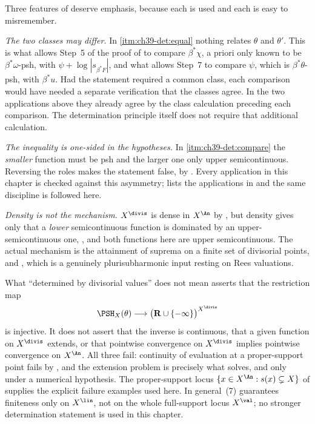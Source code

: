 Three features of  deserve emphasis,
because each is used and each is easy to misremember.

\emph{The two classes may differ.}  In \cref{itm:ch39-det:equal} nothing
relates $\theta$ and $\theta'$.  This is what allows Step~5 of the proof
of  to compare $\beta^*\chi$, a
priori only known to be $\beta^*\omega$-psh, with
$\psi+\log|s_{\beta^*F}|$, and what allows Step~7 to compare
$\psi$, which is $\beta^*\theta$-psh, with $\beta^*u$.  Had the
statement required a common class, each comparison would have needed a
separate verification that the classes agree.  In the two applications
above they already agree by the class calculation preceding each comparison.  The determination
principle itself does not require that additional calculation.

\emph{The inequality is one-sided in the hypotheses.}  In
\cref{itm:ch39-det:compare} the \emph{smaller} function must be psh and the
larger one only upper semicontinuous.  Reversing the roles makes the
statement false, by .  Every application in
this chapter is checked against this asymmetry; 
lists the applications in  and the same
discipline is followed here.

\emph{Density is not the mechanism.}  $X^{\divis}$ is dense in
$X^{\An}$ by , but density gives only
that a \emph{lower} semicontinuous function is dominated by an
upper-semicontinuous one, , and both functions
here are upper semicontinuous.  The actual mechanism is the attainment of
suprema on a finite set of divisorial points,
 and , which
is a genuinely plurisubharmonic input resting on Rees valuations.

\begin{warning}{What ``determined by divisorial values'' does not mean}
\label{warn:ch39-determination-hypotheses}
 asserts that the restriction map
\[
 \PSH_X(\theta)\longrightarrow
 \bigl(\mathbf R\cup\{-\infty\}\bigr)^{X^{\divis}}
\]
is injective.  It does not assert that the inverse is continuous, that a
given function on $X^{\divis}$ extends, or that pointwise convergence on
$X^{\divis}$ implies pointwise convergence on $X^{\An}$.  All three
fail: continuity of evaluation at a proper-support point fails by
, and the extension problem is
precisely what  solves, and only under
a numerical hypothesis.  The proper-support locus
$\{x\in X^{\An}:s(x)\subsetneq X\}$ of
 supplies the explicit failure examples used
here.  In general \,(7) guarantees finiteness
only on $X^{\lin}$, not on the whole full-support locus
$X^{\val}$; no stronger determination statement is used in this
chapter.
\end{warning}


